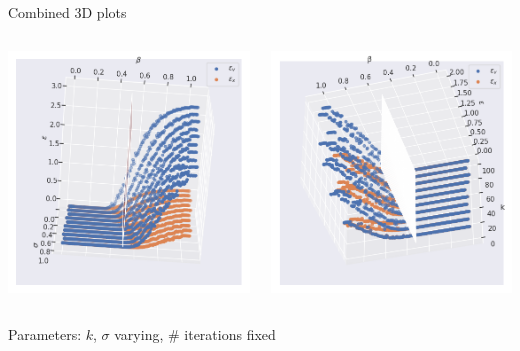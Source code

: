\documentclass{beamer}
\begin{document}
\begin{frame}{Combined 3D plots}
	\begin{minipage}[0.95\textheight]{\textwidth}
	\begin{columns}[T]
	\begin{column}{0.50\textwidth}
	\includegraphics[width=\textwidth, keepaspectratio]{../images/N100_3d.png}
	\end{column}
	\begin{column}{0.50\textwidth}
	\includegraphics[width=\textwidth, keepaspectratio]{../images/sigma1_3d.png}
	\end{column}
	\end{columns}
	\end{minipage}
	\begin{center}
		Parameters: $k$, $\sigma$ varying, \# iterations fixed
	\end{center}
\end{frame}
\end{document}
